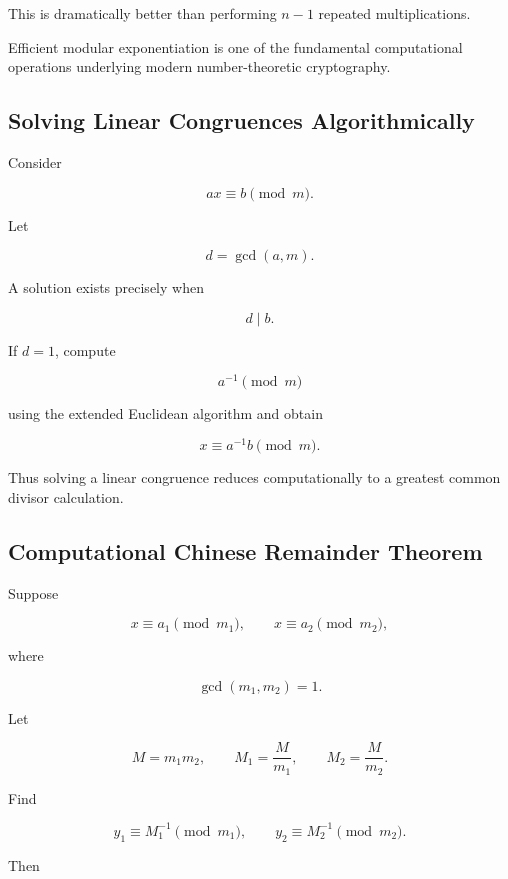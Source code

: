 This is dramatically better than performing \(n-1\) repeated
multiplications.

\begin{importantbox}
Efficient modular exponentiation is one of the fundamental computational
operations underlying modern number-theoretic cryptography.
\end{importantbox}

\subsection{Solving Linear Congruences Algorithmically}
\label{subsec:computational-linear-congruences}

Consider

\[ ax\equiv b\pmod m. \]

Let

\[ d=\gcd(a,m). \]

A solution exists precisely when

\[ d\mid b. \]

If \(d=1\), compute

\[ a^{-1}\pmod m \]

using the extended Euclidean algorithm and obtain

\[ x\equiv a^{-1}b\pmod m. \]

Thus solving a linear congruence reduces computationally to a greatest common
divisor calculation.

\subsection{Computational Chinese Remainder Theorem}
\label{subsec:computational-crt}

Suppose

\[
x\equiv a_1\pmod{m_1},\qquad
x\equiv a_2\pmod{m_2},
\]

where

\[ \gcd(m_1,m_2)=1. \]

Let

\[ M=m_1m_2,\qquad M_1=\frac{M}{m_1},\qquad M_2=\frac{M}{m_2}. \]

Find

\[ y_1\equiv M_1^{-1}\pmod{m_1},\qquad y_2\equiv M_2^{-1}\pmod{m_2}. \]

Then

